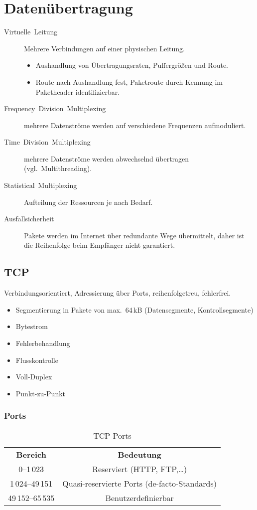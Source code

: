 \chapter{Datenübertragung}
\begin{description}
\item [{Virtuelle~Leitung}] Mehrere Verbindungen auf einer physischen
Leitung.

\begin{itemize}
\item Aushandlung von Übertragungsraten, Puffergrößen und Route.
\item Route nach Aushandlung fest, Paketroute durch Kennung im Paketheader identifizierbar.
\end{itemize}
\item [{Frequency~Division~Multiplexing}] mehrere Datenströme werden auf verschiedene Frequenzen aufmoduliert.
\item [{Time~Division~Multiplexing}] mehrere Datenströme werden abwechselnd übertragen (vgl.~Multithreading).
\item [{Statistical~Multiplexing}] Aufteilung der Ressourcen je nach Bedarf.
\item [{Ausfallsicherheit}] Pakete werden im Internet über redundante Wege übermittelt, daher ist die Reihenfolge beim Empfänger nicht garantiert.
\end{description}

\section{TCP}

Verbindungsorientiert, Adressierung über Ports, reihenfolgetreu, fehlerfrei.
\begin{itemize}
\item Segmentierung in Pakete von max.~64\,kB (Datensegmente, Kontrollsegmente)
\item Bytestrom
\item Fehlerbehandlung
\item Flusskontrolle
\item Voll-Duplex
\item Punkt-zu-Punkt
\end{itemize}

\subsection{Ports}

\begin{table}[h]
\centering
\begin{tabular}{cc}
\bfseries Bereich & \bfseries Bedeutung \\
0--1\,023 & Reserviert (HTTP, FTP,\ldots) \\
1\,024--49\,151 & Quasi-reservierte Ports (de-facto-Standards) \\
49\,152--65\,535 & Benutzerdefinierbar
\end{tabular}

\caption{TCP Ports}
\end{table}


